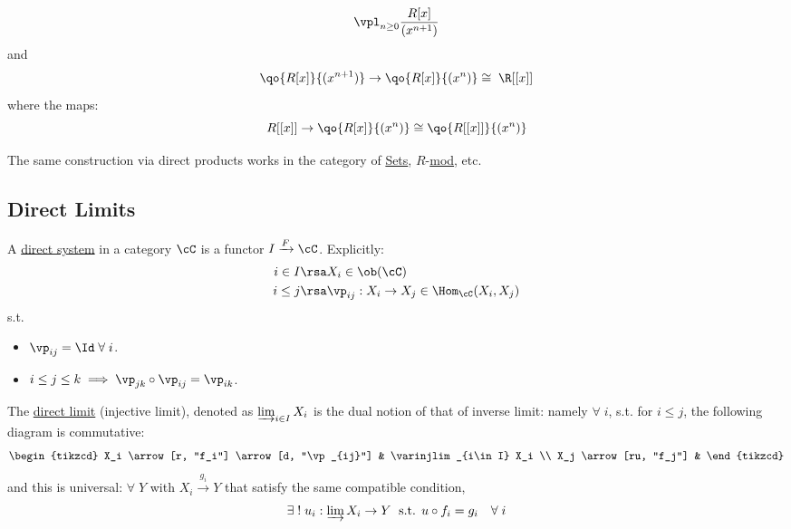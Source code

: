 \begin{eg}
	\leavevmode
	\[
		\vpl_{n\geq 0} \frac{R[x]}{(x^{n+1})}
	\]
	and
	\[
		\qo{R[x]}{(x^{n+1})} \to \qo{R[x]}{(x^n)} \cong \; \R[[x]]
	\]
	where the maps:
	\[
		R[[x]] \to \qo{R[x]}{(x^n)} \cong \qo{R[[x]]}{(x^n)}
	\]
\end{eg}

\begin{remark}
	The same construction via direct products works in the category of \underline{Sets}, \( R
	\)-\underline{mod}, etc.
\end{remark}

\subsection{Direct Limits}

\begin{definition}
	A \underline{direct system} in a category \( \cC \) is a functor \( I \xrightarrow{F} \cC \). Explicitly:
	\[
		\begin{aligned}
			i \in I & \rsa X_i \in \ob(\cC)                               \\
			i\leq j & \rsa \vp_{ij}: X_i \to X_j \in \Hom_{\cC}(X_i, X_j)
		\end{aligned}
	\]
	s.t.
	\begin{itemize}
		\item \( \vp_{ij} = \Id \; \forall \; i \).
		\item \( i\leq j \leq k \implies \vp_{jk} \circ \vp_{ij} = \vp_{ik} \).
	\end{itemize}
\end{definition}

\begin{definition}
	The \underline{direct limit} (injective limit), denoted as \( \varinjlim_{i \in I} X_i \) is the
	dual notion of that of inverse limit: namely \( \forall \; i \), s.t. for \( i\leq j \), the following diagram is commutative:
	\[
		\begin{tikzcd}
			X_i \arrow[r, "f_i"] \arrow[d, "\vp_{ij}"] & \varinjlim_{i\in I} X_i \\
			X_j \arrow[ru, "f_j"] &
		\end{tikzcd}
	\]
	and this is universal: \( \forall \; Y \) with \( X_i \xrightarrow{g_i} Y \) that satisfy the same
	compatible condition,
	\[
		\exists \; ! \; u_i: \varinjlim X_i \to Y \; \text{ s.t. } u\circ f_i = g_i \quad \forall \; i
	\]
\end{definition}

